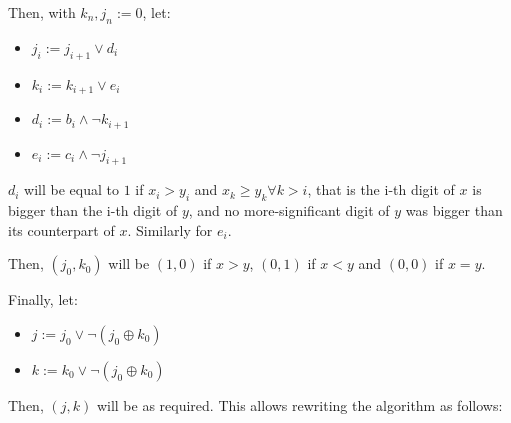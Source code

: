 \documentclass[a4paper]{scrreprt}
\begin{document}
Then, with $k_n, j_n := 0$, let:
\begin{itemize}
		\item $j_i := j_{i+1} \lor d_i$
		\item $k_i := k_{i+1} \lor e_i$
		\item $d_i := b_i \land \neg k_{i+1}$
		\item $e_i := c_i \land \neg j_{i+1}$
\end{itemize}

$d_i$ will be equal to $1$ if $x_i > y_i$ and $x_k \geq y_k \forall k > i$,
that is the i-th digit of $x$ is bigger than the i-th digit of $y$, and no
more-significant digit of $y$ was bigger than its counterpart of $x$. Similarly
for $e_i$.

Then, $(j_0, k_0)$ will be $(1, 0)$ if $x > y$, $(0, 1)$ if $x < y$ and $(0,
0)$ if $x = y$.

Finally, let:
\begin{itemize}
		\item $j := j_0 \lor \neg (j_0 \oplus k_0)$
		\item $k := k_0 \lor \neg (j_0 \oplus k_0)$
\end{itemize}

Then, $(j, k)$ will be as required. This allows rewriting the algorithm as
follows:
\end{document}
